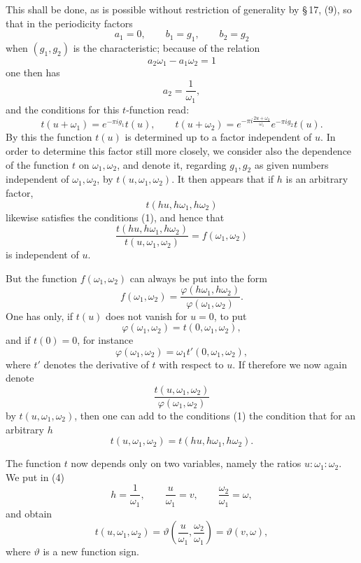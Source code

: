 \documentclass[11pt]{article}
\begin{document}
This shall be done, as is possible without restriction of generality by \S\,17, (9), so that in the periodicity factors
\[
a_1=0,\qquad b_1=g_1,\qquad b_2=g_2
\]
when $(g_1,g_2)$ is the characteristic; because of the relation
\[
a_2\omega_1-a_1\omega_2=1
\]
one then has
\[
a_2=\frac{1}{\omega_1},
\]
and the conditions for this $t$-function read:
\begin{equation}
t(u+\omega_1)=e^{-\pi i g_1}t(u),\qquad
t(u+\omega_2)=e^{-\pi i\frac{2u+\omega_2}{\omega_1}}e^{-\pi i g_2}t(u).
\tag{1}
\end{equation}
By this the function $t(u)$ is determined up to a factor independent of $u$. In order to determine this factor still more closely, we consider also the dependence of the function $t$ on $\omega_1,\omega_2$, and denote it, regarding $g_1,g_2$ as given numbers independent of $\omega_1,\omega_2$, by $t(u,\omega_1,\omega_2)$. It then appears that if $h$ is an arbitrary factor,
\[
t(hu,h\omega_1,h\omega_2)
\]
likewise satisfies the conditions (1), and hence that
\begin{equation}
\frac{t(hu,h\omega_1,h\omega_2)}{t(u,\omega_1,\omega_2)}=f(\omega_1,\omega_2)
\tag{2}
\end{equation}
is independent of $u$.

But the function $f(\omega_1,\omega_2)$ can always be put into the form
\[
f(\omega_1,\omega_2)=\frac{\varphi(h\omega_1,h\omega_2)}{\varphi(\omega_1,\omega_2)}.
\]
One has only, if $t(u)$ does not vanish for $u=0$, to put
\[
\varphi(\omega_1,\omega_2)=t(0,\omega_1,\omega_2),
\]
and if $t(0)=0$, for instance
\[
\varphi(\omega_1,\omega_2)=\omega_1t'(0,\omega_1,\omega_2),
\]
where $t'$ denotes the derivative of $t$ with respect to $u$. If therefore we now again denote
\begin{equation}
\frac{t(u,\omega_1,\omega_2)}{\varphi(\omega_1,\omega_2)}
\tag{3}
\end{equation}
by $t(u,\omega_1,\omega_2)$, then one can add to the conditions (1) the condition that for an arbitrary $h$
\begin{equation}
t(u,\omega_1,\omega_2)=t(hu,h\omega_1,h\omega_2).
\tag{4}
\end{equation}

The function $t$ now depends only on two variables, namely the ratios $u:\omega_1:\omega_2$. We put in (4)
\[
h=\frac1{\omega_1},\qquad \frac{u}{\omega_1}=v,\qquad \frac{\omega_2}{\omega_1}=\omega,
\]
and obtain
\begin{equation}
t(u,\omega_1,\omega_2)=\vartheta\!\left(\frac{u}{\omega_1},\frac{\omega_2}{\omega_1}\right)=\vartheta(v,\omega),
\tag{5}
\end{equation}
where $\vartheta$ is a new function sign.
\end{document}
